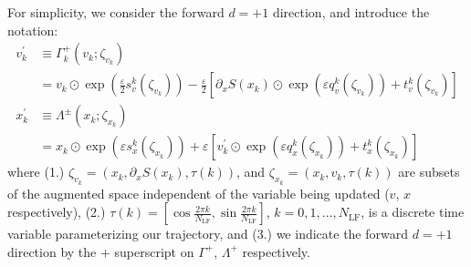 \documentclass{article} %
\begin{document}
For simplicity, we consider the forward \(d=+1\) direction, and introduce the notation:
%
\begin{align}
   v^{\prime}_{k} &\equiv \Gamma^{+}_{k}(v_{k};\zeta_{v_{k}})\nonumber\\
   &= v_{k}\odot \exp{\left(\tfrac{\varepsilon}{2}s_{v}^{k}(\zeta_{v_{k}})\right)} -
      \tfrac{\varepsilon}{2}{\left[\partial_{x}S(x_{k})\odot\exp{\left(\varepsilon q_{v}^{k}(\zeta_{v_{k}})\right)}
      +t_{v}^{k}(\zeta_{v_{k}})\right]}\\
   x^{\prime}_{k} &\equiv \Lambda^{\pm}(x_{k};\zeta_{x_{k}})\nonumber\\
   &= x_{k}\odot\exp(\varepsilon s^{k}_{x}(\zeta_{x_{k}}))
         + \varepsilon\left[v^{\prime}_{k}\odot\exp(\varepsilon q^{k}_{x}(\zeta_{x_{k}}))
         + t^{k}_{x}(\zeta_{x_{k}})\right]
\end{align}
%
where (1.) \(\zeta_{v_{k}} = (x_{k}, \partial_{x}S(x_{k}), \tau(k))\), and \(\zeta_{x_{k}} = (x_{k}, v_{k}, \tau(k))\)
are subsets of the augmented space independent of the variable being updated (\(v\), \(x\) respectively), (2.) \(\tau(k)
= {\left[\cos\tfrac{2\pi k}{N_{\mathrm{LF}}}, \sin\tfrac{2\pi k}{N_{\mathrm{LF}}}\right]}\), \(k = 0, 1, \ldots,
N_{\mathrm{LF}}\), is a discrete time variable parameterizing our trajectory, and (3.) we indicate the forward \(d=+1\)
direction by the \(+\) superscript on \(\Gamma^{+}\), \(\Lambda^{+}\) respectively.
%
\end{document}
